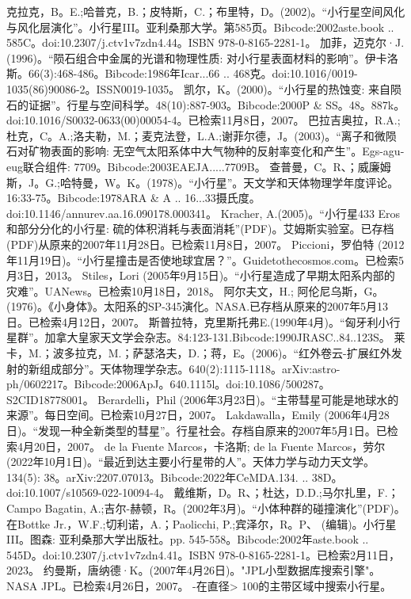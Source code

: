 \begin{enumerate}
 克拉克，B。E.;哈普克，B.；皮特斯，C.；布里特，D。(2002)。“小行星空间风化与风化层演化”。小行星III。亚利桑那大学。第585页。Bibcode:2002aste.book .. 585C。doi:10.2307/j.ctv1v7zdn4.44。ISBN 978-0-8165-2281-1。
 加菲，迈克尔·J.(1996)。“陨石组合中金属的光谱和物理性质: 对小行星表面材料的影响”。伊卡洛斯。66(3):468-486。Bibcode:1986年Icar...66 .. 468克。doi:10.1016/0019-1035(86)90086-2。ISSN0019-1035。 
 凯尔，K。(2000)。“小行星的热蚀变: 来自陨石的证据”。行星与空间科学。48(10):887-903。Bibcode:2000P & SS。48。887k。doi:10.1016/S0032-0633(00)00054-4。已检索11月8日，2007。
 巴拉吉奥拉，R.A.;杜克，C。A.;洛夫勒，M.；麦克法登，L.A.;谢菲尔德，J。(2003)。“离子和微陨石对矿物表面的影响: 无空气太阳系体中大气物种的反射率变化和产生”。Egs-agu-eug联合组件: 7709。Bibcode:2003EAEJA.....7709B。
 查普曼，C。R、；威廉姆斯，J。G.;哈特曼，W。K。(1978)。“小行星”。天文学和天体物理学年度评论。16:33-75。Bibcode:1978ARA & A .. 16...33摄氏度。doi:10.1146/annurev.aa.16.090178.000341。
 Kracher, A.(2005)。“小行星433 Eros和部分分化的小行星: 硫的体积消耗与表面消耗”(PDF)。艾姆斯实验室。已存档(PDF)从原来的2007年11月28日。已检索11月8日，2007。
 Piccioni，罗伯特 (2012年11月19日)。“小行星撞击是否使地球宜居？”。Guidetothecosmos.com。已检索5月3日，2013。
 Stiles，Lori (2005年9月15日)。“小行星造成了早期太阳系内部的灾难”。UANews。已检索10月18日，2018。
 阿尔夫文，H.; 阿伦尼乌斯，G。(1976)。《小身体》。太阳系的SP-345演化。NASA.已存档从原来的2007年5月13日。已检索4月12日，2007。
 斯普拉特，克里斯托弗E.(1990年4月)。“匈牙利小行星群”。加拿大皇家天文学会杂志。84:123-131.Bibcode:1990JRASC..84..123S。
 莱卡，M.；波多拉克，M.；萨瑟洛夫，D.；蒋，E。(2006)。“红外卷云-扩展红外发射的新组成部分”。天体物理学杂志。640(2):1115-1118。arXiv:astro-ph/0602217。Bibcode:2006ApJ。640.1115l。doi:10.1086/500287。S2CID18778001。 
 Berardelli，Phil (2006年3月23日)。“主带彗星可能是地球水的来源”。每日空间。已检索10月27日，2007。
 Lakdawalla，Emily (2006年4月28日)。“发现一种全新类型的彗星”。行星社会。存档自原来的2007年5月1日。已检索4月20日，2007。
 de la Fuente Marcos，卡洛斯; de la Fuente Marcos，劳尔 (2022年10月1日)。“最近到达主要小行星带的人”。天体力学与动力天文学。134(5): 38。arXiv:2207.07013。Bibcode:2022年CeMDA.134. .. 38D。doi:10.1007/s10569-022-10094-4。
 戴维斯，D。R、；杜达，D.D.;马尔扎里，F.；Campo Bagatin, A.;吉尔-赫顿，R。(2002年3月)。“小体种群的碰撞演化”(PDF)。在Bottke Jr.，W.F.;切利诺，A.；Paolicchi, P.;宾泽尔，R。P、 (编辑)。小行星III。图森: 亚利桑那大学出版社。pp. 545-558。Bibcode:2002年aste.book .. 545D。doi:10.2307/j.ctv1v7zdn4.41。ISBN  978-0-8165-2281-1。已检索2月11日，2023。
 约曼斯，唐纳德·K。(2007年4月26日)。"JPL小型数据库搜索引擎"。NASA JPL。已检索4月26日，2007。 -在直径> 100的主带区域中搜索小行星。

\end{enumerate}
